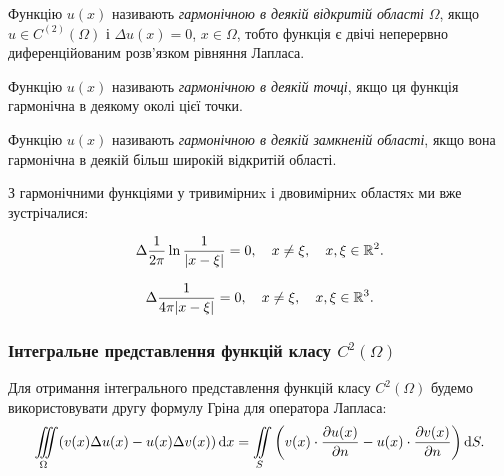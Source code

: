 \begin{definition} 
	Функцію $u(x)$ називають \textit{гармонічною в деякій відкритій області} $\Omega$, якщо $u \in C^{(2)}(\Omega)$ і $\Delta u(x) = 0$, $x \in \Omega$, тобто функція є двічі неперервно диференційованим розв'язком рівняння Лапласа.
\end{definition}

\begin{definition}
	Функцію $u(x)$ називають \textit{гармонічною в деякій точці}, якщо ця функція гармонічна в деякому околі цієї точки.
\end{definition}

\begin{definition}
	Функцію $u(x)$ називають \textit{гармонічною в деякій замкненій області}, якщо вона гармонічна в деякій більш широкій відкритій області.
\end{definition}

З гармонічними функціями у тривимірниx і двовимірниx областяx ми вже зустрічалися:

\begin{example}
	\begin{equation}
		\label{eq:4.5.1}
		\Delta \frac{1}{2 \pi} \ln \frac{1}{|x - \xi|} = 0, \quad x \ne \xi, \quad x, \xi \in \mathbb{R}^2.
	\end{equation}
\end{example}

\begin{example}
	\begin{equation}
		\label{eq:4.5.2}
		\Delta \frac{1}{4 \pi |x - \xi|} = 0, \quad x \ne \xi, \quad x, \xi \in \mathbb{R}^3.
	\end{equation}
\end{example}

\subsubsection{Інтегральне представлення функцій класу \texorpdfstring{$C^2(\Omega)$}{C2Omega}}

Для отримання інтегрального представлення функцій класу $C^2(\Omega)$ будемо використовувати другу формулу Гріна для оператора Лапласа:
\begin{equation}
	\label{eq:4.5.3}
	\displaystyle\iiint\limits_\Omega ( v(x) \Delta u(x) - u(x) \Delta v(x) ) \mathop{}\!\mathrm{d} x = \displaystyle\iint\limits_S \left( v(x) \cdot \frac{\partial u(x)}{\partial n} - u(x) \cdot \frac{\partial v(x)}{\partial n} \right) \mathop{}\!\mathrm{d} S.
\end{equation}

